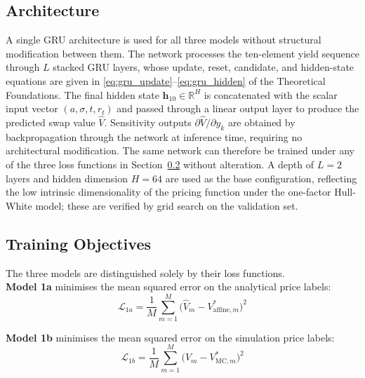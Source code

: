   \subsection{Architecture}
  \label{sec:architecture}

  A single GRU architecture is used for all three models without structural
  modification between them. The network processes the ten-element yield sequence
  through $L$ stacked GRU layers, whose update, reset, candidate, and hidden-state
  equations are given in \eqref{eq:gru_update}--\eqref{eq:gru_hidden} of the
  Theoretical Foundations. The final hidden state $\mathbf{h}_{10} \in
  \mathbb{R}^H$ is concatenated with the scalar input vector $(a, \sigma, t, r_t)$
  and passed through a linear output layer to produce the predicted swap value
  $\hat{V}$. Sensitivity outputs $\partial\hat{V}/\partial y_k$ are obtained by
  backpropagation through the network at inference time, requiring no architectural
  modification. The same network can therefore be trained under any of the three
  loss functions in Section~\ref{sec:training_objectives} without alteration. A
  depth of $L = 2$ layers and hidden dimension $H = 64$ are used as the base
  configuration, reflecting the low intrinsic dimensionality of the pricing
  function under the one-factor Hull-White model; these are verified by grid search
  on the validation set.

  \subsection{Training Objectives}
  \label{sec:training_objectives}

  The three models are distinguished solely by their loss functions. \\

  \noindent
  \textbf{Model 1a} minimises the mean squared error on the analytical price
  labels:
  \begin{equation}
    \mathcal{L}_{1a}
      = \frac{1}{M}\sum_{m=1}^{M}
          \bigl(\hat{V}_m - V_{\mathrm{affine},m}^*\bigr)^2
    \label{eq:loss_1a}
  \end{equation}

  \noindent
  \textbf{Model 1b} minimises the mean squared error on the simulation price
  labels:
  \begin{equation}
    \mathcal{L}_{1b}
      = \frac{1}{M}\sum_{m=1}^{M}
          \bigl(\hat{V}_m - V_{\mathrm{MC},m}^*\bigr)^2
    \label{eq:loss_1b}
  \end{equation}

